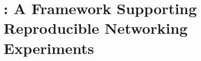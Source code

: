 
\chapter[\triscale: Supporting Reproducibility in Networking]{\triscale: A Framework Supporting Reproducible Networking Experiments}
\label{ch:triscale}

\renewcommand{\ChapPath}{20_TriScale}
\renewcommand{\PathTab}{\ChapPath/Tables}














\begin{subappendices}
\newpage

\end{subappendices}

